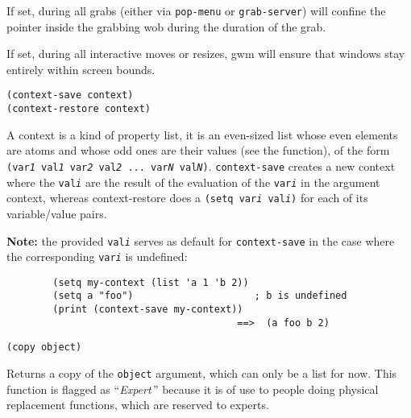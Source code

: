

If set, during all grabs (either via \verb"pop-menu" or \verb"grab-server")
will confine the pointer inside the grabbing wob during the duration of
the grab.



If set, during all interactive moves or resizes, gwm will ensure that windows
stay entirely within screen bounds.

        
{\usagefont\begin{verbatim}
(context-save context)
(context-restore context)
\end{verbatim}}\usageupspace

A context is a kind of property list, it is an even-sized list whose even
elements are atoms and whose odd ones are their values (see the 
function), of the form {\tt (var{\it 1} val{\it 1} var{\it 2} val{\it 2} ...
var{\it N} val{\it N})}. \verb"context-save" creates a new context
where the {\tt val{\it i}} are the result of the evaluation of the
{\tt var{\it i}} in the argument context, whereas context-restore does
a {\tt (setq var{\it i} val{\it i})} for each of its variable/value pairs.

{\bf Note:} the provided {\tt val{\it i}} serves as default for
\verb"context-save" in the case where the corresponding {\tt var{\it i}} is
undefined:

{\exemplefont\begin{verbatim}
        (setq my-context (list 'a 1 'b 2))
        (setq a "foo")                     ; b is undefined
        (print (context-save my-context))
                                        ==>  (a foo b 2)
\end{verbatim}}


{\usagefont\begin{verbatim}
(copy object)
\end{verbatim}}\usageupspace

Returns a copy of the \verb"object" argument, which can only be a list for
now. This function is flagged as ``{\em Expert}\,'' because it is of use
to people doing physical replacement functions, which are reserved to
experts.

